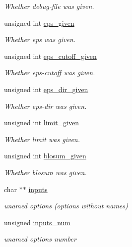 \begin{DoxyCompactItemize}
\begin{DoxyCompactList}\small\item\em Whether debug-\/file was given. \end{DoxyCompactList}\item 
unsigned int \hyperlink{structgengetopt__args__info_a9d52e7e979f21f9278bcb39005164a44}{eps\+\_\+given}
\begin{DoxyCompactList}\small\item\em Whether eps was given. \end{DoxyCompactList}\item 
unsigned int \hyperlink{structgengetopt__args__info_a60b5aec84888abe557256b1909b01a01}{eps\+\_\+cutoff\+\_\+given}
\begin{DoxyCompactList}\small\item\em Whether eps-\/cutoff was given. \end{DoxyCompactList}\item 
unsigned int \hyperlink{structgengetopt__args__info_a33c0504245a49e483924248119b400a6}{eps\+\_\+dir\+\_\+given}
\begin{DoxyCompactList}\small\item\em Whether eps-\/dir was given. \end{DoxyCompactList}\item 
unsigned int \hyperlink{structgengetopt__args__info_a1058bb49a05830b377b2335d9ae1c7c9}{limit\+\_\+given}
\begin{DoxyCompactList}\small\item\em Whether limit was given. \end{DoxyCompactList}\item 
unsigned int \hyperlink{structgengetopt__args__info_a5c4114dd20295edf631f04e637214386}{blosum\+\_\+given}
\begin{DoxyCompactList}\small\item\em Whether blosum was given. \end{DoxyCompactList}\item 
char $\ast$$\ast$ \hyperlink{structgengetopt__args__info_a9604690019dd09b318302dae6868726c}{inputs}
\begin{DoxyCompactList}\small\item\em unamed options (options without names) \end{DoxyCompactList}\item 
unsigned \hyperlink{structgengetopt__args__info_a3d69c180d5ac0b1124fd9a6fe680706c}{inputs\+\_\+num}
\begin{DoxyCompactList}\small\item\em unamed options number \end{DoxyCompactList}\end{DoxyCompactItemize}


